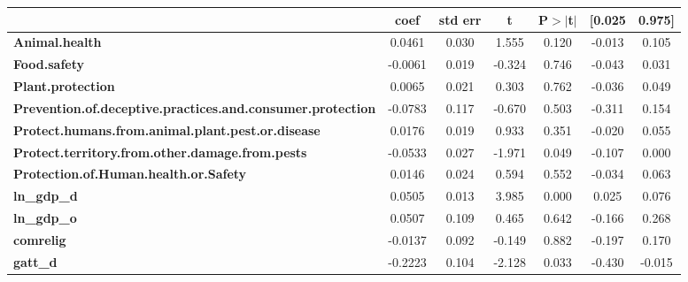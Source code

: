 \begin{center}
\begin{tabular}{lcccccc}
                                                                   & \textbf{coef} & \textbf{std err} & \textbf{t} & \textbf{P$> |$t$|$} & \textbf{[0.025} & \textbf{0.975]}  \\
\midrule
\textbf{Animal.health}                                             &       0.0461  &        0.030     &     1.555  &         0.120        &       -0.013    &        0.105     \\
\textbf{Food.safety}                                               &      -0.0061  &        0.019     &    -0.324  &         0.746        &       -0.043    &        0.031     \\
\textbf{Plant.protection}                                          &       0.0065  &        0.021     &     0.303  &         0.762        &       -0.036    &        0.049     \\
\textbf{Prevention.of.deceptive.practices.and.consumer.protection} &      -0.0783  &        0.117     &    -0.670  &         0.503        &       -0.311    &        0.154     \\
\textbf{Protect.humans.from.animal.plant.pest.or.disease}          &       0.0176  &        0.019     &     0.933  &         0.351        &       -0.020    &        0.055     \\
\textbf{Protect.territory.from.other.damage.from.pests}            &      -0.0533  &        0.027     &    -1.971  &         0.049        &       -0.107    &        0.000     \\
\textbf{Protection.of.Human.health.or.Safety}                      &       0.0146  &        0.024     &     0.594  &         0.552        &       -0.034    &        0.063     \\
\textbf{ln\_gdp\_d}                                                &       0.0505  &        0.013     &     3.985  &         0.000        &        0.025    &        0.076     \\
\textbf{ln\_gdp\_o}                                                &       0.0507  &        0.109     &     0.465  &         0.642        &       -0.166    &        0.268     \\
\textbf{comrelig}                                                  &      -0.0137  &        0.092     &    -0.149  &         0.882        &       -0.197    &        0.170     \\
\textbf{gatt\_d}                                                   &      -0.2223  &        0.104     &    -2.128  &         0.033        &       -0.430    &       -0.015     \\

\end{tabular}
\end{center}
